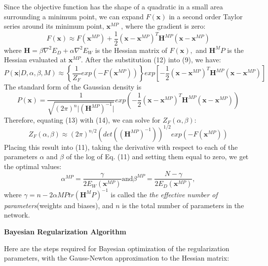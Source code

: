 \documentclass[a4paper, 12pt, english, parskip]{scrartcl}
\begin{document}
Since the objective function has the shape of a quadratic in a small area surrounding a minimum point, we can expand $F(\boldsymbol{x})$ in a second order Taylor series around its minimum point, $\boldsymbol{x}^{MP}$ , where the gradient is zero:
\begin{equation}
    F(\boldsymbol{x}) \approx F(\boldsymbol{x}^{MP}) + \frac{1}{2}(\boldsymbol{x} - \boldsymbol{x}^{MP})^T\boldsymbol{H}^{MP}(\boldsymbol{x}-\boldsymbol{x}^{MP})
\end{equation}
where $\boldsymbol{H} = \beta \nabla^2 E_D + \alpha \nabla^2 E_W$ is the Hessian matrix of $F(\boldsymbol{x}),$ and $\boldsymbol{H}^MP$ is the Hessian evaluated at $\boldsymbol{x}^{MP}.$ After the substitution (12) into (9), we have:
\begin{equation}
    P(\boldsymbol{x} \vert D, \alpha, \beta, M) \approx \left\{\frac{1}{Z_F}exp(-F(\boldsymbol{x}^{MP}))\right\}exp\left[ -\frac{1}{2}(\boldsymbol{x} - \boldsymbol{x}^{MP})^T\boldsymbol{H}^{MP}(\boldsymbol{x}-\boldsymbol{x}^{MP})\right]
\end{equation}
The standard form of the Gaussian density is
\begin{equation}
    P(\boldsymbol{x} ) = \frac{1}{\sqrt{(2\pi)^n \vert (\boldsymbol{H}^{MP})^{-1} \vert}}exp\left( -\frac{1}{2}(\boldsymbol{x} - \boldsymbol{x}^{MP})^T\boldsymbol{H}^{MP}(\boldsymbol{x}-\boldsymbol{x}^{MP})\right)
\end{equation}
Therefore, equating (13) with (14), we can solve for $Z_F(\alpha, \beta)$:
\begin{equation}
    Z_F(\alpha, \beta) \approx (2\pi)^{n/ 2}(det((\boldsymbol{H}^{MP})^{-1}))^{1/2}exp(-F(\boldsymbol{x}^{MP}))
\end{equation}
Placing this result into (11), taking the derivative with respect to each of the parameters $\alpha$ and $\beta$ of the log of Eq. (11) and setting them equal to zero, we get the optimal values:
\begin{equation}
    \alpha^{MP} = \frac{\gamma}{2E_W(\boldsymbol{x}^{MP})} \text{and} \beta^{MP} = \frac{N - \gamma}{2E_D(\boldsymbol{x}^{MP})},
\end{equation}
where $\gamma = n - 2\alpha{MP} tr(\boldsymbol{H}^MP)^{-1}$ is called the \textit{the effective number of parameters}(weights and biases), and $n$ is the total number of parameters in the network.

\textbf{Bayesian Regularization Algorithm}

Here are the steps required for Bayesian optimization of the regularization parameters, with the Gauss-Newton approximation to the Hessian matrix:
\end{document}
